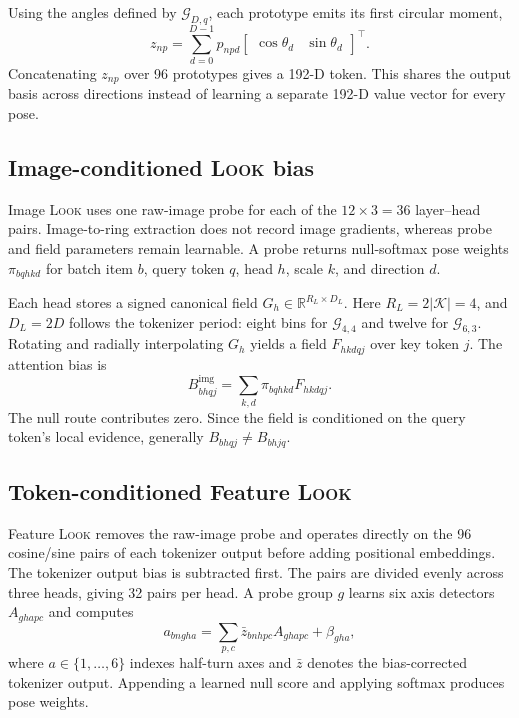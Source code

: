 \documentclass[10pt]{article}
\newcommand{\look}{\textsc{Look}}
\newcommand{\R}{\mathbb{R}}
\newcommand{\geom}[2]{\ensuremath{\mathcal{G}_{#1,#2}}}
\begin{document}
Using the angles defined by \geom{D}{q}, each prototype emits its first
circular moment,
\begin{equation}
 z_{np}=\sum_{d=0}^{D-1}p_{npd}
 \begin{bmatrix}\cos\theta_d&\sin\theta_d\end{bmatrix}^{\!\top}.
 \label{eq:harmonic}
\end{equation}
Concatenating $z_{np}$ over 96 prototypes gives a 192-D token. This shares the
output basis across directions instead of learning a separate 192-D value
vector for every pose.

\subsection{Image-conditioned \look{} bias}
\label{sec:image-look}

Image \look{} uses one raw-image probe for each of the $12\times3=36$
layer--head pairs. Image-to-ring extraction does not record image gradients,
whereas probe and field parameters remain learnable. A probe returns
null-softmax pose weights $\pi_{bqhkd}$ for batch item $b$, query token $q$,
head $h$, scale $k$, and direction $d$.

Each head stores a signed canonical field
$G_h\in\R^{R_L\times D_L}$. Here $R_L=2|\mathcal K|=4$, and $D_L=2D$ follows
the tokenizer period: eight bins for \geom{4}{4} and twelve for \geom{6}{3}. Rotating and
radially interpolating $G_h$ yields a field $F_{hkdqj}$ over key token $j$.
The attention bias is
\begin{equation}
 B_{bhqj}^{\mathrm{img}}=\sum_{k,d}\pi_{bqhkd}F_{hkdqj}.
 \label{eq:image-look}
\end{equation}
The null route contributes zero. Since the field is conditioned on the query
token's local evidence, generally $B_{bhqj}\neq B_{bhjq}$.

\subsection{Token-conditioned Feature \look{}}
\label{sec:center-look}

Feature \look{} removes the raw-image probe and operates directly on the 96
cosine/sine pairs of each tokenizer output before adding positional embeddings.
The tokenizer output bias is subtracted first. The pairs are divided evenly
across three heads, giving 32 pairs per head. A probe group $g$ learns six axis
detectors $A_{ghapc}$ and computes
\begin{equation}
 a_{bngha}=\sum_{p,c}\bar z_{bnhpc}A_{ghapc}+\beta_{gha},
 \label{eq:center-probe}
\end{equation}
where $a\in\{1,\ldots,6\}$ indexes half-turn axes and $\bar z$ denotes the
bias-corrected tokenizer output. Appending a learned null score and applying
softmax produces pose weights.
\end{document}
